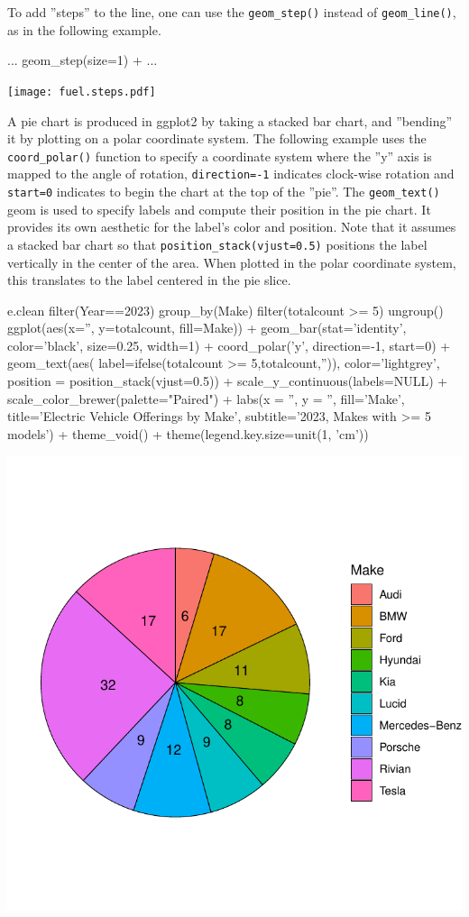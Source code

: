 To add ''steps'' to the line, one can use the \texttt{geom\_step()} instead of \texttt{geom\_line()}, as in the following example.

\begin{samepage}
\begin{Rcode}
...
     geom_step(size=1) + 
... 
\end{Rcode}
\end{samepage}

\begin{center}
  \texttt{[image: fuel.steps.pdf]}
\end{center}

A pie chart is produced in ggplot2 by taking a stacked bar chart, and ''bending'' it by plotting on a polar coordinate system. The following example uses the \texttt{coord\_polar()} function to specify a coordinate system where the ''y'' axis is mapped to the angle of rotation, \texttt{direction=-1} indicates clock-wise rotation and \texttt{start=0} indicates to begin the chart at the top of the ''pie''. The \texttt{geom\_text()} geom is used to specify labels and compute their position in the pie chart. It provides its own aesthetic for the label's color and position. Note that it assumes a stacked bar chart so that \texttt{position\_stack(vjust=0.5)} positions the label vertically in the center of the area. When plotted in the polar coordinate system, this translates to the label centered in the pie slice. 

\begin{samepage}
\begin{Rcode}
e.clean %
  filter(Year==2023) %
  group_by(Make) %
  filter(totalcount >= 5) %
  ungroup() %
ggplot(aes(x='', y=totalcount, fill=Make)) +
  geom_bar(stat='identity', 
           color='black', size=0.25, width=1) + 
  coord_polar('y', direction=-1, start=0) +
  geom_text(aes(
     label=ifelse(totalcount >= 5,totalcount,'')), 
     color='lightgrey', 
     position = position_stack(vjust=0.5)) +
  scale_y_continuous(labels=NULL) + 
  scale_color_brewer(palette="Paired") +
  labs(x = '', y = '',  fill='Make', 
       title='Electric Vehicle Offerings by Make', 
       subtitle='2023, Makes with >= 5 models') +
  theme_void() +
  theme(legend.key.size=unit(1, 'cm'))
\end{Rcode}
\end{samepage}

\begin{center}
  \includegraphics[width=.5\textwidth]{fuel.pie.pdf}
\end{center}

